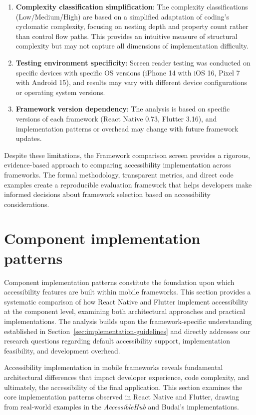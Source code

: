 {\begin{enumerate}
    \item \textbf{Complexity classification simplification}: The complexity classifications (Low/Medium/High) are based on a simplified adaptation of coding's cyclomatic complexity, focusing on nesting depth and property count rather than control flow paths. This provides an intuitive measure of structural complexity but may not capture all dimensions of implementation difficulty.
    
    \item \textbf{Testing environment specificity}: Screen reader testing was conducted on specific devices with specific OS versions (iPhone 14 with iOS 16, Pixel 7 with Android 15), and results may vary with different device configurations or operating system versions.
    
    \item \textbf{Framework version dependency}: The analysis is based on specific versions of each framework (React Native 0.73, Flutter 3.16), and implementation patterns or overhead may change with future framework updates.
\end{enumerate}

Despite these limitations, the Framework comparison screen provides a rigorous, evidence-based approach to comparing accessibility implementation across frameworks. The formal methodology, transparent metrics, and direct code examples create a reproducible evaluation framework that helps developers make informed decisions about framework selection based on accessibility considerations.

\section{Component implementation patterns}
\label{subsec:implementation-patterns}

Component implementation patterns constitute the foundation upon which accessibility features are built within mobile frameworks. This section provides a systematic comparison of how React Native and Flutter implement accessibility at the component level, examining both architectural approaches and practical implementations. The analysis builds upon the framework-specific understanding established in Section~\ref{sec:implementation-guidelines} and directly addresses our
research questions regarding default accessibility support, implementation feasibility, and development overhead.

Accessibility implementation in mobile frameworks reveals fundamental architectural differences that impact developer experience, code complexity, and ultimately, the accessibility of the final application. This section examines the core implementation patterns observed in React Native and Flutter, drawing from real-world examples in the \textit{AccessibleHub} and Budai's implementations. 

}
